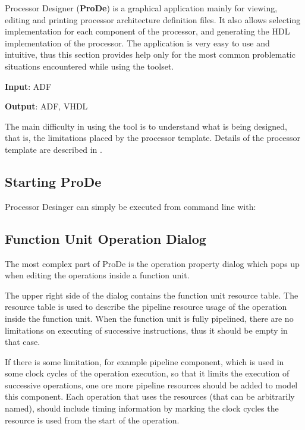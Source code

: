 \documentclass[a4paper,twoside]{tceusermanual}
\begin{document}
Processor Designer (\textbf{ProDe}) is a graphical application mainly for
viewing, editing and printing processor architecture definition files. 
It also allows selecting implementation for each component of the processor,
and generating the HDL implementation of the processor. The application is
very easy to use and intuitive, thus this section provides help only for the
most common problematic situations encountered while using the toolset.

\textbf{Input}: ADF

\textbf{Output}: ADF, VHDL

The main difficulty in using the tool is to understand what is being
designed, that is, the limitations placed by the processor template. 
Details of the processor template are described in \cite{ADF-specs}.


\subsection{Starting ProDe}

Processor Desinger can simply be executed from command line with:


\subsection{Function Unit Operation Dialog}

The most complex part of ProDe is the operation property dialog which pops
up when editing the operations inside a function unit.


The upper right side of the dialog contains the function unit resource table.
The resource table is used to describe the pipeline resource usage of the
operation inside the function unit.
When the function unit is fully pipelined, there are no limitations on
executing of successive instructions, thus it should be empty in that case.

If there is some limitation, for example pipeline component, which is used in 
some clock cycles of the operation execution, so that it limits the execution of 
successive operations, one ore more pipeline resources should be added to model 
this component. Each operation that uses the resources (that can be arbitrarily
named), should include timing information by marking the clock cycles the resource
is used from the start of the operation.
\end{document}
